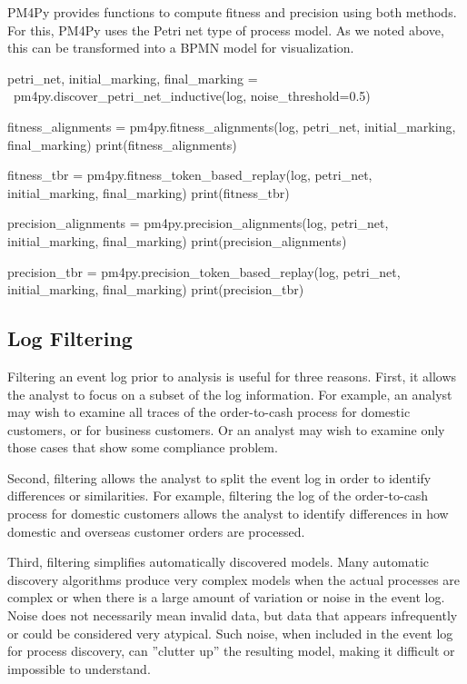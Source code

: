 PM4Py provides functions to compute fitness and precision using both methods. For this, PM4Py uses the Petri net type of process model. As we noted above, this can be transformed into a BPMN model for visualization. 

\begin{samepage}
\begin{pythoncode}
petri_net, initial_marking, final_marking = \
    pm4py.discover_petri_net_inductive(log, noise_threshold=0.5)

fitness_alignments = pm4py.fitness_alignments(log,
    petri_net, initial_marking, final_marking)
print(fitness_alignments)

fitness_tbr = pm4py.fitness_token_based_replay(log, 
    petri_net, initial_marking, final_marking)
print(fitness_tbr)

precision_alignments = pm4py.precision_alignments(log,
    petri_net, initial_marking, final_marking)
print(precision_alignments)

precision_tbr = pm4py.precision_token_based_replay(log, 
    petri_net, initial_marking, final_marking)
print(precision_tbr)
\end{pythoncode}
\end{samepage}

\subsection*{Log Filtering}

Filtering an event log prior to analysis is useful for three reasons. First, it allows the analyst to focus on a subset of the log information. For example, an analyst may wish to examine all traces of the order-to-cash process for domestic customers, or for business customers. Or an analyst may wish to examine only those cases that show some compliance problem. 

Second, filtering allows the analyst to split the event log in order to identify differences or similarities. For example, filtering the log of the order-to-cash process for domestic customers allows the analyst to identify differences in how domestic and overseas customer orders are processed. 

Third, filtering simplifies automatically discovered models. Many automatic discovery algorithms produce very complex models when the actual processes are complex or when there is a large amount of variation or noise in the event log. Noise does not necessarily mean invalid data, but data that appears infrequently or could be considered very atypical. Such noise, when included in the event log for process discovery, can ''clutter up'' the resulting model, making it difficult or impossible to understand.

